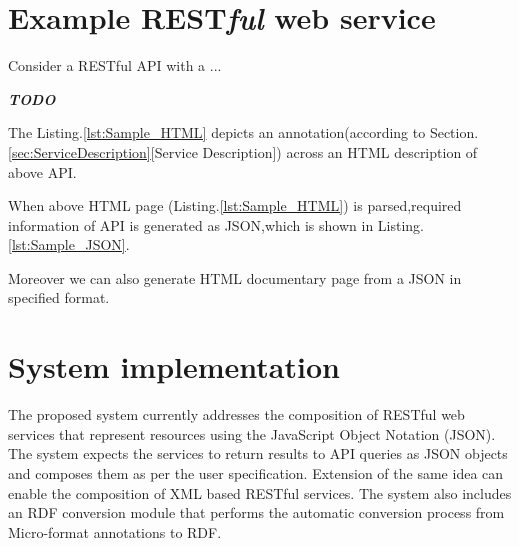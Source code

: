 \documentclass[journal]{IEEEtran}
\begin{document}
\section{Example REST{\it ful} web service}

\vspace{50pt}
Consider a RESTful API with a ...

\textbf{\textit{TODO}}\\
\vspace{50pt}

The Listing.\ref{lst:Sample_HTML} depicts an annotation(according to Section.\ref{sec:ServiceDescription}[Service Description]) across an HTML description of above API. 

When above HTML page (Listing.\ref{lst:Sample_HTML}) is parsed,required information of API is generated as JSON,which is shown in  Listing.\ref{lst:Sample_JSON}.

Moreover we can also generate HTML documentary page from a JSON in specified format.






\section{System implementation}

The proposed system currently addresses the composition of RESTful web services that represent resources using the JavaScript Object Notation (JSON). The system expects the services to return results to API queries as JSON objects and composes them as per the user specification. Extension of the same idea can enable the composition of XML based RESTful services. The system also includes an RDF conversion module that performs the automatic conversion process from Micro-format annotations to RDF\cite{rdf}.
\end{document}
